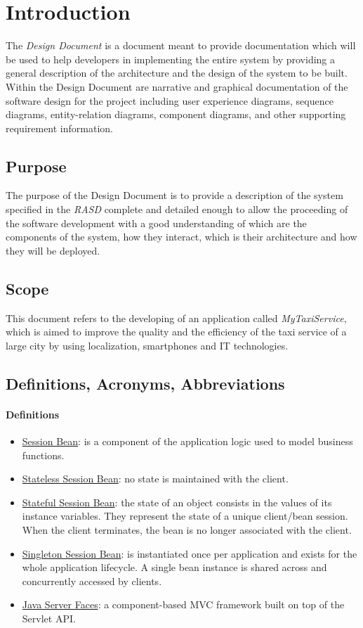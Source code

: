 \chapter{Introduction} \label{chap1}
The \textit{Design Document} is a document meant to provide documentation which will be used to help developers in implementing the entire system by providing a general description of the architecture and the design of the system to be built. Within the Design Document are narrative and graphical documentation of the software design for the project including user experience diagrams, sequence diagrams, entity-relation diagrams, component diagrams, and other supporting requirement information.

\section{Purpose}
The purpose of the Design Document is to provide a description of the system specified in the \textit{RASD} complete and detailed enough to allow the proceeding of the software development with a good understanding of which are the components of the system, how they interact, which is their architecture and how they will be deployed.

\section{Scope}
This document refers to the developing of an application called \textit{MyTaxiService}, which is aimed to improve the quality and the efficiency of the taxi service of a large city by using localization, smartphones and IT technologies.

\section{Definitions, Acronyms, Abbreviations}
\subsubsection{Definitions}
\begin{itemize}
	\item \underline{Session Bean}: is a component of the application logic used to model business functions.
	\item \underline{Stateless Session Bean}: no state is maintained with the client.
	\item \underline{Stateful Session Bean}: the state of an object consists in the values of its instance variables. They represent the state of a unique client/bean session. When the client terminates, the bean is no longer associated with the client.
	\item \underline{Singleton Session Bean}: is instantiated once per application and exists for the whole application lifecycle. A single bean instance is shared across and concurrently accessed by clients.
	\item \underline{Java Server Faces}: a component-based MVC framework built on top of the Servlet API.
\end{itemize}

